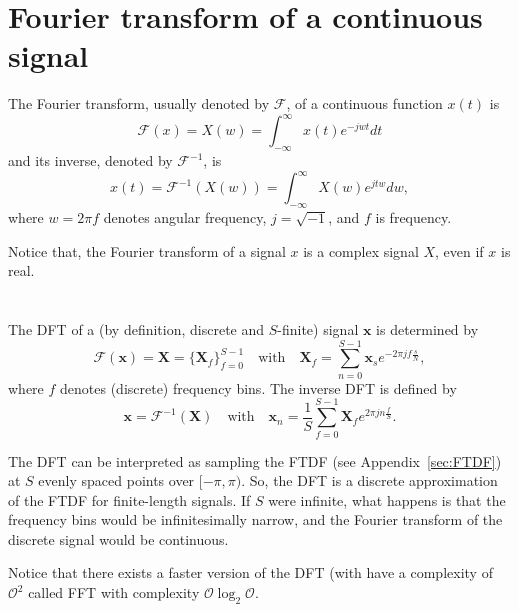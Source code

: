 \section{Fourier transform of a continuous signal}
\label{sec:Fourier_transform}

The Fourier transform, usually denoted by $\mathcal{F}$, of a
continuous function $x(t)$ is
\begin{equation}
  \mathcal{F}(x) = X(w) = \int_{-\infty}^{\infty}x(t)e^{-jwt}dt
  \label{eq:FT}
\end{equation}
and its inverse, denoted by $\mathcal{F}^{-1}$, is
\begin{equation}
  x(t) = \mathcal{F}^{-1}(X(w)) = \int_{-\infty}^{\infty}X(w)e^{jtw}dw,
\end{equation}
where $w=2\pi f$ denotes angular frequency, $j=\sqrt{-1}$, and
$f$ is frequency.

Notice that, the Fourier transform of a signal $x$ is a complex signal
$X$, even if $x$ is real.


\section{}
\label{sec:DFT}

The \gls{DFT} of a (by definition, discrete and $S$-finite) signal
$\bm{x}$ is determined by
\begin{equation}
  \mathcal{F}(\bm{x}) = \mathbf{X} = \{\mathbf{X}_f\}_{f=0}^{S-1} \quad \text{with} \quad \mathbf{X}_f=\sum_{n=0}^{S-1}\bm{x}_se^{-2\pi jf\frac{s}{N}},
  \label{eq:DFT}
\end{equation}
where $f$ denotes (discrete) frequency bins. The inverse \gls{DFT} is defined by
\begin{equation}
  \bm{x} = \mathcal{F}^{-1}(\mathbf{X}) \quad \text{with} \quad \bm{x}_n = \frac{1}{S}\sum_{f=0}^{S-1}\mathbf{X}_fe^{2\pi jn\frac{f}{S}}.
\end{equation}

The \gls{DFT} can be interpreted as sampling the \gls{FTDF} (see
Appendix~\ref{sec:FTDF}) at $S$ evenly spaced points over $[-\pi,
  \pi)$. So, the \gls{DFT} is a discrete approximation of the
  \gls{FTDF} for finite-length signals. If $S$ were infinite, what
  happens is that the frequency bins would be infinitesimally narrow,
  and the Fourier transform of the discrete signal would be
  continuous.

Notice that there exists a faster version of the \gls{DFT} (with have
a complexity of $\mathcal{O}^2$ called \gls{FFT} with complexity
$\mathcal{O}\log_2\mathcal{O}$.

